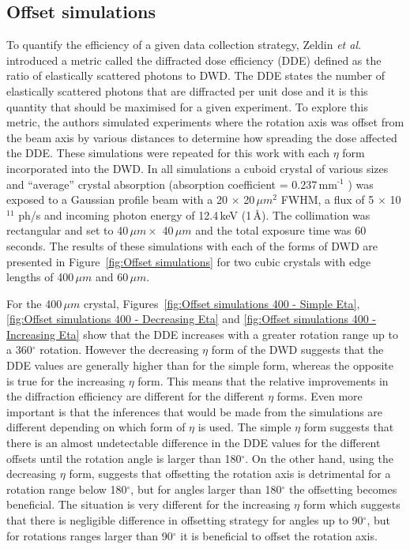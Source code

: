 \subsection{Offset simulations}
\label{sub:Offset Simulations}
To quantify the efficiency of a given data collection strategy, Zeldin \textit{et al.} introduced a metric called the diffracted dose efficiency (DDE) defined as the ratio of elastically scattered photons to DWD.
The DDE states the number of elastically scattered photons that are diffracted per unit dose and it is this quantity that should be maximised for a given experiment.
To explore this metric, the authors simulated experiments where the rotation axis was offset from the beam axis by various distances to determine how spreading the dose affected the DDE.
These simulations were repeated for this work with each $\eta$ form incorporated into the DWD.
In all simulations a cuboid crystal of various sizes and ``average'' crystal absorption (absorption coefficient = 0.237$\,$mm$^{\text{-1}}$ \cite{zeldin2013}) was exposed to a Gaussian profile beam with a 20 $\times$ 20$\,\mu m^{\text{2}}$ FWHM, a flux of 5 $\times$ 10$^{\text{11}}$ ph/s and incoming photon energy of 12.4$\,$keV (1$\,$\AA).
The collimation was rectangular and set to 40$\,\mu m \times$ 40$\,\mu m$ and the total exposure time was 60 seconds.
The results of these simulations with each of the forms of DWD are presented in Figure~\ref{fig:Offset simulations} for two cubic crystals with edge lengths of 400$\,\mu m$ and 60$\,\mu m$.

For the 400$\,\mu m$ crystal, Figures~\ref{fig:Offset simulations 400 - Simple Eta}, \ref{fig:Offset simulations 400 - Decreasing Eta} and \ref{fig:Offset simulations 400 - Increasing Eta} show that the DDE increases with a greater rotation range up to a 360$^{\circ}$ rotation.
However the decreasing $\eta$ form of the DWD suggests that the DDE values are generally higher than for the simple form, whereas the opposite is true for the increasing $\eta$ form.
This means that the relative improvements in the diffraction efficiency are different for the different $\eta$ forms.
Even more important is that the inferences that would be made from the simulations are different depending on which form of $\eta$ is used.
The simple $\eta$ form suggests that there is an almost undetectable difference in the DDE values for the different offsets until the rotation angle is larger than 180$^{\circ}$.
On the other hand, using the decreasing $\eta$ form, suggests that offsetting the rotation axis is detrimental for a rotation range below 180$^{\circ}$, but for angles larger than 180$^{\circ}$ the offsetting becomes beneficial.
The situation is very different for the increasing $\eta$ form which suggests that there is negligible difference in offsetting strategy for angles up to 90$^{\circ}$, but for rotations ranges larger than 90$^{\circ}$ it is beneficial to offset the rotation axis.

